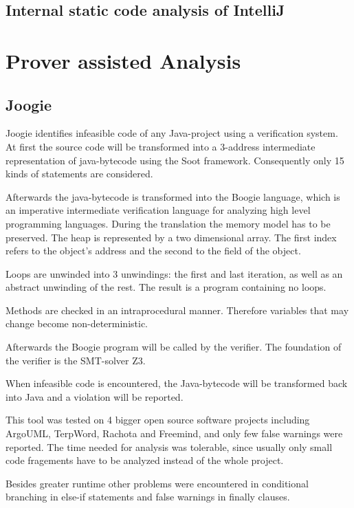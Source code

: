 \subsection{Internal static code analysis of IntelliJ}
\label{sec:intelliJ}




\section{Prover assisted Analysis}




\subsection{Joogie}
\label{sec:sca paper}

Joogie \cite{arltJoogieInfeasibleCode2012, arltJoogieJavaJimple2013} identifies infeasible code of any Java-project using a verification system. 
At first the source code will be transformed into a 3-address intermediate representation of java-bytecode using the Soot framework. Consequently only 15 kinds of statements are considered. 

Afterwards the java-bytecode is transformed into the Boogie language, which is an imperative intermediate verification language for analyzing high level programming languages.
During the translation the memory model has to be preserved. The heap is represented by a two dimensional array. The first index refers to the object's address and the second to the field of the object.

Loops are unwinded into 3 unwindings: the first and last iteration, as well as an abstract unwinding of the rest.
The result is a program containing no loops.


Methods are checked in an intraprocedural manner. Therefore variables that may change become non-deterministic. 


Afterwards the Boogie program will be called by the verifier. 
The foundation of the verifier is the SMT-solver Z3.



When infeasible code is encountered, the Java-bytecode will be transformed back into Java and a violation will be reported.


This tool was tested on 4 bigger open source software projects including ArgoUML, TerpWord, Rachota and Freemind, and only few false warnings were reported.
The time needed for analysis was tolerable, since usually only small code fragements have to be analyzed instead of the whole project.



Besides greater runtime other problems were encountered in conditional branching in else-if statements and false warnings in finally clauses.
